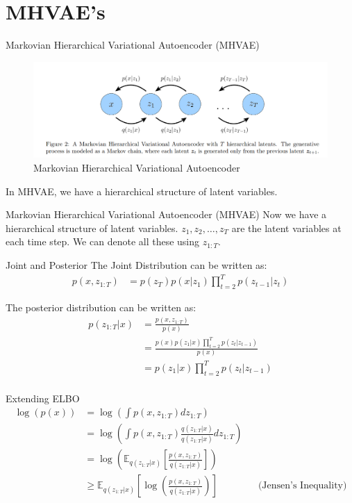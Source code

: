 \section*{MHVAE's}
\begin{frame}{Markovian Hierarchical Variational Autoencoder (MHVAE)}
    \begin{figure}
        \centering
        \includegraphics[width=1\textwidth]{Images/hvae1.png}
        \caption{Markovian Hierarchical Variational Autoencoder}
    \end{figure}

    In MHVAE, we have a hierarchical structure of latent variables. 
\end{frame}

\begin{frame}{Markovian Hierarchical Variational Autoencoder (MHVAE)}
    Now we have a hierarchical structure of latent variables.
    $z_1, z_2, \ldots, z_T$ are the latent variables at each time step. We can denote all these using $z_{1:T}$.
\end{frame}

\begin{frame}{Joint and Posterior}
    The Joint Distribution can be written as:  
    \begin{align*}
        p(x, z_{1:T}) &= p(z_T)p(x|z_1) \prod_{t=2}^{T} p(z_{t-1}|z_t)
    \end{align*}

    The posterior distribution can be written as:
    \begin{align*}
        p(z_{1:T}|x) &= \frac{p(x, z_{1:T})}{p(x)} \\
        &= \frac{p(x)p(z_1|x) \prod_{t=2}^{T} p(z_{t}|z_{t-1})}{p(x)} \\
        &= p(z_1|x) \prod_{t=2}^{T} p(z_{t}|z_{t-1}) \\
    \end{align*}
\end{frame}

\begin{frame}{Extending ELBO}
    \begin{align*}
        \log(p(x)) &= \log \left( \int p(x, z_{1:T}) dz_{1:T} \right) \\
        &= \log \left( \int p(x, z_{1:T}) \frac{q(z_{1:T}|x)}{q(z_{1:T}|x)} dz_{1:T} \right) \\
        &= \log \left( \mathbb{E}_{q(z_{1:T}|x)} \left[ \frac{p(x, z_{1:T})}{q(z_{1:T}|x)} \right] \right) \\
        &\geq \mathbb{E}_{q(z_{1:T}|x)} \left[ \log \left( \frac{p(x, z_{1:T})}{q(z_{1:T}|x)} \right) \right] && \text{(Jensen's Inequality)} \\
    \end{align*}
\end{frame}

